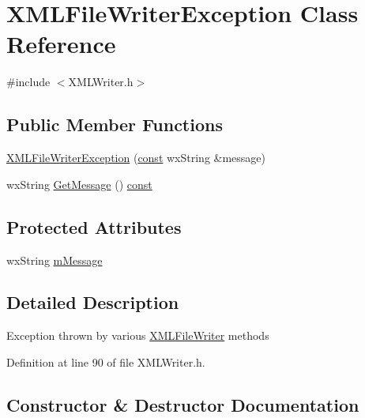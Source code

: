 \hypertarget{class_x_m_l_file_writer_exception}{}\section{X\+M\+L\+File\+Writer\+Exception Class Reference}
\label{class_x_m_l_file_writer_exception}


{\ttfamily \#include $<$X\+M\+L\+Writer.\+h$>$}

\subsection*{Public Member Functions}
\begin{DoxyCompactItemize}
\item 
\hyperlink{class_x_m_l_file_writer_exception_a164927293db819d7b91c1f68c98c9605}{X\+M\+L\+File\+Writer\+Exception} (\hyperlink{getopt1_8c_a2c212835823e3c54a8ab6d95c652660e}{const} wx\+String \&message)
\item 
wx\+String \hyperlink{class_x_m_l_file_writer_exception_a0866105969b12f6d9ab6e21d8210c1a8}{Get\+Message} () \hyperlink{getopt1_8c_a2c212835823e3c54a8ab6d95c652660e}{const} 
\end{DoxyCompactItemize}
\subsection*{Protected Attributes}
\begin{DoxyCompactItemize}
\item 
wx\+String \hyperlink{class_x_m_l_file_writer_exception_a2234a7f472811e9cd5000dbd46d3af80}{m\+Message}
\end{DoxyCompactItemize}


\subsection{Detailed Description}
Exception thrown by various \hyperlink{class_x_m_l_file_writer}{X\+M\+L\+File\+Writer} methods 

Definition at line 90 of file X\+M\+L\+Writer.\+h.



\subsection{Constructor \& Destructor Documentation}
